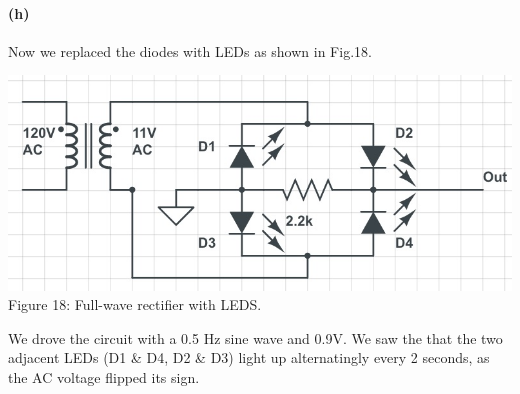 \documentclass[]{article}
\begin{document}
	\paragraph{ (h)} 	
	Now we replaced the diodes with LEDs as shown in Fig.18.
		\begin{center}
			\includegraphics[scale=0.3]{h_circuit}\\
			Figure 18: Full-wave rectifier with LEDS.
		\end{center}
	We drove the circuit with a 0.5 Hz sine wave and 0.9V. We saw the that the two adjacent LEDs (D1 \& D4, D2 \& D3) light up alternatingly every 2 seconds, as the AC voltage flipped its sign. 
\end{document}
